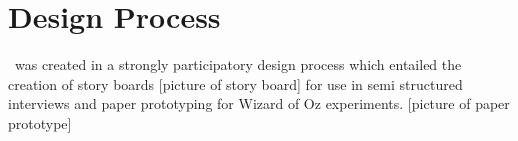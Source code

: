 \documentclass{chi-ext}
\begin{document}

\section{Design Process}
\drunkened\ was created in a strongly participatory design process which entailed the creation of story boards [picture of story board] for use in semi structured interviews and paper prototyping for Wizard of Oz experiments. [picture of paper prototype]
\end{document}
